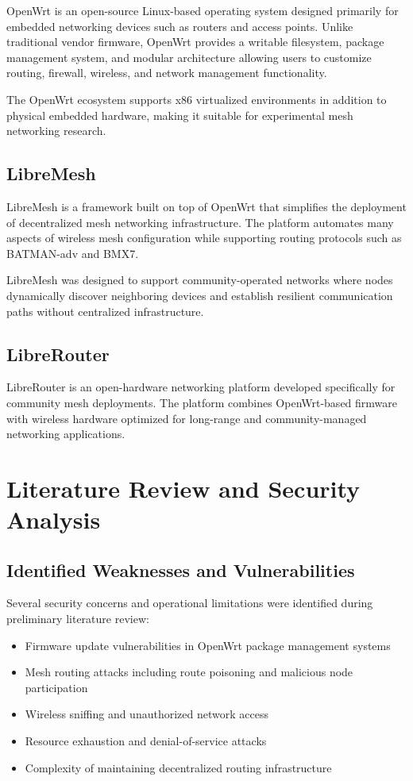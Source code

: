 \documentclass[conference]{IEEEtran}
\begin{document}
OpenWrt is an open-source Linux-based operating system designed primarily for embedded networking devices such as routers and access points. Unlike traditional vendor firmware, OpenWrt provides a writable filesystem, package management system, and modular architecture allowing users to customize routing, firewall, wireless, and network management functionality.

The OpenWrt ecosystem supports x86 virtualized environments in addition to physical embedded hardware, making it suitable for experimental mesh networking research.

\subsection{LibreMesh}

LibreMesh is a framework built on top of OpenWrt that simplifies the deployment of decentralized mesh networking infrastructure. The platform automates many aspects of wireless mesh configuration while supporting routing protocols such as BATMAN-adv and BMX7.

LibreMesh was designed to support community-operated networks where nodes dynamically discover neighboring devices and establish resilient communication paths without centralized infrastructure.

\subsection{LibreRouter}

LibreRouter is an open-hardware networking platform developed specifically for community mesh deployments. The platform combines OpenWrt-based firmware with wireless hardware optimized for long-range and community-managed networking applications.

\section{Literature Review and Security Analysis}

\subsection{Identified Weaknesses and Vulnerabilities}

Several security concerns and operational limitations were identified during preliminary literature review:

\begin{itemize}
    \item Firmware update vulnerabilities in OpenWrt package management systems
    \item Mesh routing attacks including route poisoning and malicious node participation
    \item Wireless sniffing and unauthorized network access
    \item Resource exhaustion and denial-of-service attacks
    \item Complexity of maintaining decentralized routing infrastructure
\end{itemize}
\end{document}
